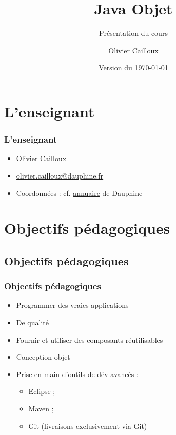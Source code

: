 \documentclass[english, french]{beamer}
\title{Java Objet}
\subtitle{Présentation du cours}
\author{Olivier Cailloux}
\institute[LAMSADE]{LAMSADE, Université Paris-Dauphine}
\date{Version du \today}
\begin{document}


\begin{frame}[plain]
   \titlepage
\end{frame}
\addtocounter{framenumber}{-1}

\section{L’enseignant}
\begin{frame}
	\frametitle{L’enseignant}
	\begin{itemize}
		\item Olivier Cailloux
		\item \href{mailto:olivier.cailloux@dauphine.fr}{olivier.cailloux@dauphine.fr}
		\item Coordonnées : cf. \href{https://www.ent.dauphine.fr/annuaire/index.php?param0=fiche&param1=ocailloux}{annuaire} de Dauphine
	\end{itemize}
\end{frame}

\section[Obj. pédagogiques]{Objectifs pédagogiques}
\subsection{Objectifs pédagogiques}
\begin{frame}
	\frametitle{Objectifs pédagogiques}
	\begin{itemize}
		\item Programmer des vraies applications
		\item De qualité
		\item Fournir et utiliser des composants réutilisables
		\item Conception objet
		\item Prise en main d’outils de dév avancés : 
		\begin{itemize}
			\item Eclipse ;
			\item Maven ;
			\item Git (livraisons exclusivement via Git)
		\end{itemize}
	\end{itemize}
\end{frame}
\end{document}
